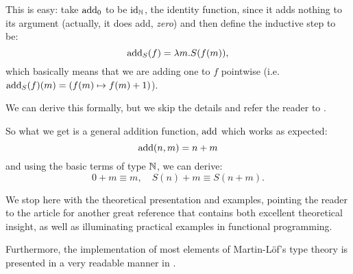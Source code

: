 This is easy: take $ \mathrm{add}_0 $ to be $ \mathrm{id}_{\mathbb{N}} $,
the identity function, since it adds nothing to its argument
(actually, it does add, \emph{zero}) and then define the
inductive step to be:
\[
  \mathrm{add}_S(f) = \lambda m . S(f(m)),
\]
which basically means that we are adding one to $ f $ pointwise
(i.e.\ $ \mathrm{add}_S(f)(m) = (f(m) \mapsto f(m) + 1) $).

We can derive this formally, but we skip the details and refer the reader
to \cite[pp.\ 12-13]{rijke}.

So what we get is a general addition function, $ \mathrm{add} $ which works
as expected:
\[
  \mathrm{add}(n, m) = n + m
\]
and using the basic terms of type $ \mathbb{N} $, we can derive:
\[
  0 + m \equiv m, \quad S(n) + m \equiv S(n + m).
\]

\vspace{0.3cm}

We stop here with the theoretical presentation and examples, pointing
the reader to the article \cite{mcbride} for another great reference that
contains both excellent theoretical insight, as well as illuminating
practical examples in functional programming.

Furthermore, the implementation of most elements of Martin-L\"{o}f's type
theory is presented in a very readable manner in \cite{pmltt}.

